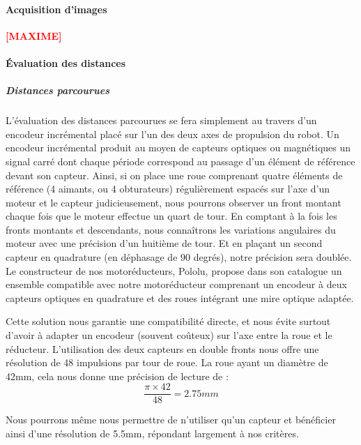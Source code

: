 		\paragraph{Acquisition d'images}

				\textbf{\huge{\textcolor{red}{[MAXIME]}}}

		\paragraph{Évaluation des distances}

			\subparagraph*{Distances parcourues}

				L'évaluation des distances parcourues se fera simplement au travers d'un encodeur incrémental placé sur l'un des deux axes de propulsion du robot. Un encodeur incrémental produit au moyen de capteurs optiques ou magnétiques un signal carré dont chaque période correspond au passage d'un élément de référence devant son capteur.
				Ainsi, si on place une roue comprenant quatre éléments de référence (4 aimants, ou 4 obturateurs) régulièrement espacés sur l'axe d'un moteur et le capteur judicieusement, nous pourrons observer un front montant chaque fois que le moteur effectue un quart de tour. En comptant à la fois les fronts montants et descendants, nous connaîtrons les variations angulaires du moteur avec une précision d'un huitième de tour. Et en plaçant un second capteur en quadrature (en déphasage de 90 degrés), notre précision sera doublée.\\

				Le constructeur de nos motoréducteurs, Pololu, propose dans son catalogue un ensemble compatible avec notre motoréducteur comprenant un encodeur à deux capteurs optiques en quadrature et des roues intégrant une mire optique adaptée.


				Cette solution nous garantie une compatibilité directe, et nous évite surtout d'avoir à adapter un encodeur (souvent coûteux) sur l'axe entre la roue et le réducteur. L'utilisation des deux capteurs en double fronts nous offre une résolution de 48 impulsions par tour de roue. La roue ayant un diamètre de 42mm, cela nous donne une précision de lecture de :
				\[\frac{\pi \times 42}{48}=2.75mm\]

				Nous pourrons même nous permettre de n'utiliser qu'un capteur et bénéficier ainsi d'une résolution de 5.5mm, répondant largement à nos critères.\\

